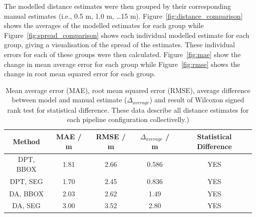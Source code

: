 The modelled distance estimates were then grouped by their corresponding manual estimates (i.e.,
0.5 m, 1.0 m, \ldots 15 m).
Figure~\ref{fig:distance_comparison} shows the averages of the modelled estimates for each
group while Figure~\ref{fig:spread_comparison} shows each individual modelled estimate for
each group, giving a visualisation of the spread of the estimates.
These individual errors for each of these groups were then calculated.
Figure~\ref{fig:mae} show the change in mean average error for each group while
Figure~\ref{fig:rmse} shows the change in root mean squared error for each group.

\vspace{1cm}

\begin{table}[htbp]
    \centering
    \caption{Mean average error (MAE), root mean squared error (RMSE), average difference between
    model and manual estimate ($\Delta_{average}$) and result of Wilcoxon signed rank test for
    statistical difference. These data describe all distance estimates for each pipeline
    configuration collectivelly.)}
    \label{tab:overall_errors}
    \begin{tabular}{ccccc}
        \textbf{Method} & \textbf{MAE / m} & \textbf{RMSE / m} & \textbf{$\Delta_{average}$ / m}
        & \textbf{Statistical Difference} \\
        \midrule
        DPT, BBOX & 1.81 & 2.66 & 0.586 & YES \\
        DPT, SEG  & 1.70 & 2.45 & 0.836 & YES \\
        DA, BBOX  & 2.03 & 2.62 & 1.49  & YES \\
        DA, SEG   & 3.00 & 3.52 & 2.80  & YES \\
    \end{tabular}
\end{table}

\clearpage

